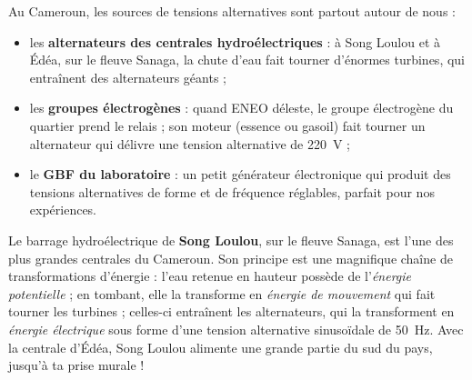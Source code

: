 \documentclass[11pt]{article}
\begin{document}
Au Cameroun, les sources de tensions alternatives sont partout autour de nous :

\begin{itemize}
\item les \textbf{alternateurs des centrales hydroélectriques} : à Song Loulou et à Édéa, sur le fleuve Sanaga, la chute d'eau fait tourner d'énormes turbines, qui entraînent des alternateurs géants ;
\item les \textbf{groupes électrogènes} : quand ENEO déleste, le groupe électrogène du quartier prend le relais ; son moteur (essence ou gasoil) fait tourner un alternateur qui délivre une tension alternative de \SI{220}{V} ;
\item le \textbf{GBF du laboratoire} : un petit générateur électronique qui produit des tensions alternatives de forme et de fréquence réglables, parfait pour nos expériences.
\end{itemize}

\begin{savaistu}
Le barrage hydroélectrique de \textbf{Song Loulou}, sur le fleuve Sanaga, est l'une des plus grandes centrales du Cameroun. Son principe est une magnifique chaîne de transformations d'énergie : l'eau retenue en hauteur possède de l'\emph{énergie potentielle} ; en tombant, elle la transforme en \emph{énergie de mouvement} qui fait tourner les turbines ; celles-ci entraînent les alternateurs, qui la transforment en \emph{énergie électrique} sous forme d'une tension alternative sinusoïdale de \SI{50}{Hz}. Avec la centrale d'Édéa, Song Loulou alimente une grande partie du sud du pays, jusqu'à ta prise murale !
\end{savaistu}
\end{document}
